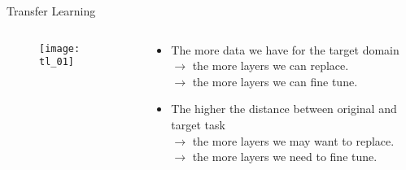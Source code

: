 \begin{frame}{Transfer Learning}
  \begin{columns}
    \begin{column}{0.2\textwidth}
      \begin{figure}
        \texttt{[image: tl\_01]}
      \end{figure}
    \end{column}
    \begin{column}{0.8\textwidth}
      \begin{itemize}
        \item The more data we have for the target domain \\
              $\rightarrow$ the more layers we can replace.\\
              $\rightarrow$ the more layers we can fine tune.\\
        \item The higher the distance between original and target task \\
              $\rightarrow$ the more layers we may want to replace.\\
              $\rightarrow$ the more layers we need to fine tune.\\
      \end{itemize}
    \end{column}
  \end{columns}

\end{frame}
